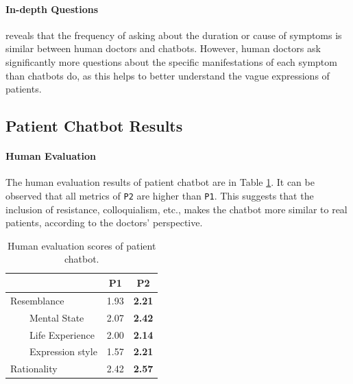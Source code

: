 
\paragraph{In-depth Questions}
 reveals that the frequency of asking about the duration or cause of symptoms is similar between human doctors and chatbots. However, human doctors ask significantly more questions about the specific manifestations of each symptom than chatbots do, as this helps to better understand the vague expressions of patients.

\subsection{Patient Chatbot Results}

\paragraph{Human Evaluation}
The human evaluation results of patient chatbot are in Table \ref{tab:human_pat}. It can be observed that all metrics of \texttt{P2}
are higher than \texttt{P1}. This suggests that the inclusion of resistance, colloquialism, etc., makes the chatbot more similar to real patients, according to the doctors' perspective.

\begin{table}[ht]
    \small
    \centering
    \begin{tabular}{l|cc}
    \hline
     & P1 & P2 \\ 
    \hline
    Resemblance & 1.93 & \textbf{2.21} \\
    ~~~~Mental State & 2.07 & \textbf{2.42} \\
    ~~~~Life Experience & 2.00 & \textbf{2.14}  \\
    ~~~~Expression style & 1.57 & \textbf{2.21} \\
    \hline
    Rationality & 2.42 & \textbf{2.57}  \\
    \hline
    \end{tabular}
    \caption{Human evaluation scores of patient chatbot.}
    \label{tab:human_pat}
\end{table}

